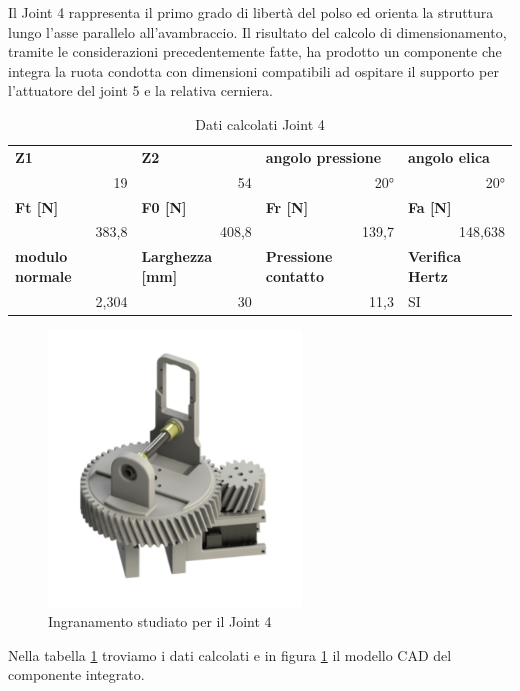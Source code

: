 \documentclass[%
corpo=11pt,
twoside,
 stile=classica,
oldstyle,
greek,%
]{toptesi}
\begin{document}
		Il Joint 4 rappresenta il primo grado di libertà del polso ed orienta la struttura lungo l'asse parallelo all'avambraccio. 
		Il risultato del calcolo di dimensionamento, tramite le considerazioni precedentemente fatte, ha prodotto un componente  che integra la ruota condotta con dimensioni compatibili ad ospitare il supporto per l'attuatore del joint 5 e la relativa cerniera.
		\begin{table}[H]
			\centering
			\caption{Dati calcolati Joint 4}
			\begin{tabular}{rrrl}
				\multicolumn{1}{l}{\textbf{Z1}} & \multicolumn{1}{l}{\textbf{Z2}} & \multicolumn{1}{l}{\textbf{angolo pressione}} & \textbf{angolo elica} \\
				19    & 54    & 20°    & \multicolumn{1}{r}{20°} \\
				\multicolumn{1}{l}{\textbf{Ft [N]}} & \multicolumn{1}{l}{\textbf{F0 [N]}} & \multicolumn{1}{l}{\textbf{Fr [N]}} & \textbf{Fa [N]} \\
				383,8 & 408,8 & 139,7 & \multicolumn{1}{r}{148,638} \\
				\multicolumn{1}{l}{\textbf{modulo normale}} & \multicolumn{1}{l}{\textbf{Larghezza [mm]}} & \multicolumn{1}{l}{\textbf{Pressione contatto}} & \textbf{Verifica Hertz} \\
				2,304 & 30    & 11,3  & SI \\
			\end{tabular}%
			\label{tab:lewis1}%
		\end{table}%
	
	
		\begin{figure} [H]
			\centering
			\includegraphics[width=0.6\textwidth]{Plots/POLSO1/wrist1.png}
			\caption{Ingranamento studiato per il Joint 4}
			\label{fig:wrist1}
		\end{figure} 
		Nella tabella \ref{tab:lewis1} troviamo i dati calcolati e in figura \ref{fig:wrist1} il modello CAD del componente integrato. 
	
\end{document}
